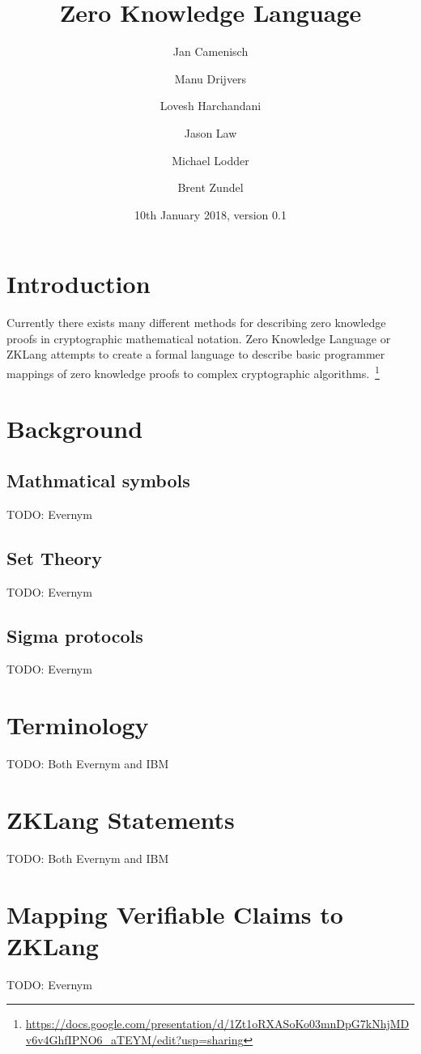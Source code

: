 \documentclass[a4paper]{article}
\title{Zero Knowledge Language}
\author[2]{Jan Camenisch}
\author[2]{Manu Drijvers}
\author[1]{Lovesh Harchandani}
\author[1]{Jason Law}
\author[1]{Michael Lodder}
\author[1]{Brent Zundel}
\affil[1]{Evernym}
\affil[2]{IBM Research -- Zurich}
\date{10th January 2018, version 0.1}
\begin{document}
\maketitle

\section{Introduction}
Currently there exists many different methods for describing zero knowledge proofs in cryptographic mathematical notation. Zero Knowledge Language or ZKLang attempts to create a formal language to describe basic programmer mappings of zero knowledge proofs to complex cryptographic algorithms.~\footnote{\url{https://docs.google.com/presentation/d/1Zt1oRXASoKo03mnDpG7kNhjMDv6v4GhfIPNO6_aTEYM/edit?usp=sharing}}

\section{Background}

\subsection{Mathmatical symbols}
TODO: Evernym

\subsection{Set Theory}
TODO: Evernym

\subsection{Sigma protocols}
TODO: Evernym

\section{Terminology}
TODO: Both Evernym and IBM
%


\section{ZKLang Statements}
TODO: Both Evernym and IBM




\section{Mapping Verifiable Claims to ZKLang}
TODO: Evernym
\end{document}
